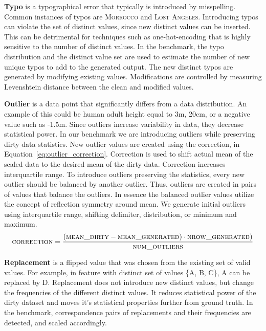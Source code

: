 \textbf{Typo} is a typographical error that typically is introduced by misspelling. 
Common instances of typos are \textsc{Morrocco} and \textsc{Lost Angeles}. 
Introducing typos can violate the set of distinct values, since new distinct values can be inserted.
This can be detrimental for techniques such as one-hot-encoding that is highly sensitive to the number of distinct values.
In the benchmark, the typo distribution and the distinct value set are used to estimate the number of new unique typos to add to the generated output. 
The new distinct typos are generated by modifying existing values. Modifications are controlled by measuring Levenshtein distance between the clean and modified values. 


\textbf{Outlier} is a data point that significantly differs from a data distribution.
An example of this could be human adult height equal to 3m, 20cm, or a negative value such as -1.5m. 
Since outliers increase variability in data, they decrease statistical power.
In our benchmark we are introducing outliers while preserving dirty data statistics. 
New outlier values are created using the correction, in Equation~\ref{eq:outlier_correction}. 
Correction is used to shift actual mean of the scaled data to the desired mean of the dirty data.
Correction increases interquartile range.
To introduce outliers preserving the statistics, every new outlier should be balanced by another outlier. Thus, outliers are created in pairs of values that balance the outliers. 
In essence the balanced outlier values utilize the concept of reflection symmetry around mean.  
We generate initial outliers using interquartile range, shifting delimiter, distribution, or minimum and maximum.
\begin{equation}
\label{eq:outlier_correction}
\textsc{correction} = \frac{(\textsc{mean\_dirty} - \textsc{mean\_generated}) \cdot \textsc{nrow\_generated})}{\textsc{num\_outliers}}
\end{equation}

\textbf{Replacement} is a flipped value that was chosen from the existing set of valid values. 
For example, in feature with distinct set of values \textsc{\{A, B, C\}}, \textsc{A} can be replaced by \textsc{D}. 
Replacement does not introduce new distinct values, but change the frequencies of the different distinct values. 
It reduces statistical power of the dirty dataset and moves it's statistical properties further from ground truth.
In the benchmark, correspondence pairs of replacements and their frequencies are detected, and scaled accordingly. 


